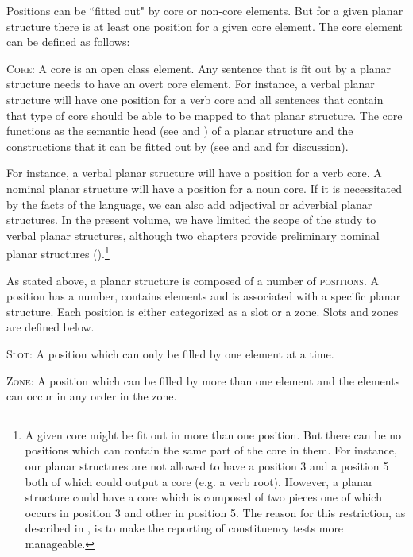 \documentclass[output=paper,draftmode]{langscibook}
\begin{document}
Positions can be ``fitted out" by core or non-core elements. But for a given planar structure there is at least one position for a given core element. The core element can be defined as follows:

\ea 
    \textsc{Core}: A core is an open class element. Any sentence that is fit out by a planar structure needs to have an overt core element. For instance, a verbal planar structure will have one position for a verb core and all sentences that contain that type of core should be able to be mapped to that planar structure. The core functions as the semantic head (see \citealt[241--280]{croft_radical_2001} and \citealt[35--37]{croft2022cambridge}) of a planar structure and the constructions that it can be fitted out by (see \citealt{tallmanconstituency2021} and  and  for discussion).
\z 

For instance, a verbal planar structure will have a position for a verb core. A nominal planar structure will have a position for a noun core. If it is necessitated by the facts of the language, we can also add adjectival or adverbial planar structures. In the present volume, we have limited the scope of the study to verbal planar structures, although two chapters provide preliminary nominal planar structures ().\footnote{A given core might be fit out in more than one position. But there can be no positions which can contain the same part of the core in them. For instance, our planar structures are not allowed to have a position 3 and a position 5 both of which could output a core (e.g. a verb root). However, a planar structure could have a core which is composed of two pieces one of which occurs in position 3 and other in position 5. The reason for this restriction, as described in , is to make the reporting of constituency tests more manageable.}

As stated above, a planar structure is composed of a number of \textsc{positions}. A position has a number, contains elements and is associated with a specific planar structure. Each position is either categorized as a slot or a zone. Slots and zones are defined below.

\ea 
\textsc{Slot}: A position which can only be filled by one element at a time.  
\z 

\ea 
\textsc{Zone}: A position which can be filled by more than one element and the elements can occur in any order in the zone.
\z 
\end{document}
